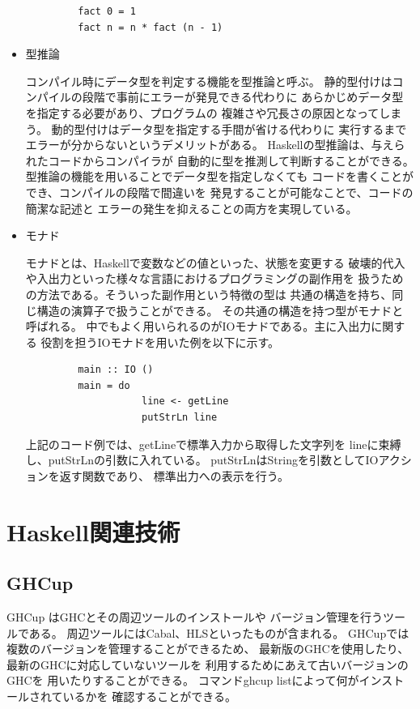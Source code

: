\documentclass{csspaper}
\begin{document}
\begin{itemize}
         \begin{lstlisting}
         fact 0 = 1
         fact n = n * fact (n - 1)
         \end{lstlisting}

         \item 型推論
      
         コンパイル時にデータ型を判定する機能を型推論と呼ぶ。
         静的型付けはコンパイルの段階で事前にエラーが発見できる代わりに
         あらかじめデータ型を指定する必要があり、プログラムの
         複雑さや冗長さの原因となってしまう。
         動的型付けはデータ型を指定する手間が省ける代わりに
         実行するまでエラーが分からないというデメリットがある。
         Haskellの型推論は、与えられたコードからコンパイラが
         自動的に型を推測して判断することができる。
         型推論の機能を用いることでデータ型を指定しなくても
         コードを書くことができ、コンパイルの段階で間違いを
         発見することが可能なことで、コードの簡潔な記述と
         エラーの発生を抑えることの両方を実現している。

         \item モナド
         
         モナドとは、Haskellで変数などの値といった、状態を変更する
         破壊的代入や入出力といった様々な言語におけるプログラミングの副作用を
         扱うための方法である。そういった副作用という特徴の型は
         共通の構造を持ち、同じ構造の演算子で扱うことができる。
         その共通の構造を持つ型がモナドと呼ばれる。
         中でもよく用いられるのがIOモナドである。主に入出力に関する
         役割を担うIOモナドを用いた例を以下に示す。

         \begin{lstlisting}
         main :: IO ()
         main = do
                    line <- getLine
                    putStrLn line
         \end{lstlisting}

         上記のコード例では、getLineで標準入力から取得した文字列を
         lineに束縛し、putStrLnの引数に入れている。
         putStrLnはStringを引数としてIOアクションを返す関数であり、
         標準出力への表示を行う。

      \end{itemize}   

   \section{Haskell関連技術}
      \subsection{GHCup}
      GHCup \cite{6}はGHCとその周辺ツールのインストールや
      バージョン管理を行うツールである。
      周辺ツールにはCabal、HLSといったものが含まれる。
      GHCupでは複数のバージョンを管理することができるため、
      最新版のGHCを使用したり、最新のGHCに対応していないツールを
      利用するためにあえて古いバージョンのGHCを
      用いたりすることができる。
      コマンドghcup listによって何がインストールされているかを
      確認することができる。
\end{document}
